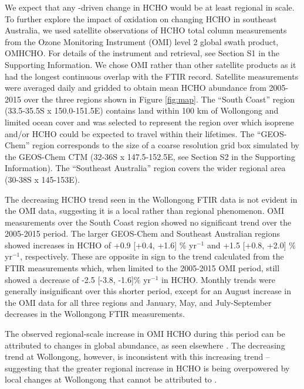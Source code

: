 \documentclass[draft,linenumbers]{AGUJournal}
\begin{document}
We expect that any -driven change in HCHO would be at least regional in scale. To further explore the impact of  oxidation on changing HCHO in southeast Australia, we used satellite observations of HCHO total column measurements from the Ozone Monitoring Instrument (OMI) level 2 global swath product, OMHCHO. For details of the instrument and retrieval, see Section S1 in the Supporting Information. We chose OMI rather than other satellite products as it had the longest continuous overlap with the FTIR record. Satellite measurements were averaged daily and gridded to obtain mean HCHO abundance from 2005-2015 over the three regions shown in Figure \ref{fig:map}. The ``South Coast'' region (33.5-35.5\degree S x 150.0-151.5\degree E) contains land within 100 km of Wollongong and limited ocean cover and was selected to represent the region over which isoprene and/or HCHO could be expected to travel within their lifetimes. The ``GEOS-Chem'' region corresponds to the size of a coarse resolution grid box simulated by the GEOS-Chem CTM (32-36\degree S x 147.5-152.5\degree E, see Section S2 in the Supporting Information). The ``Southeast Australia'' region covers the wider regional area (30-38\degree S x 145-153\degree E).

The decreasing HCHO trend seen in the Wollongong FTIR data is not evident in the OMI data, suggesting it is a local rather than regional phenomenon. OMI measurements over the South Coast region showed no significant trend over the 2005-2015 period. The larger GEOS-Chem and Southeast Australian regions showed increases in HCHO of +0.9 [+0.4, +1.6] \% yr$^{-1}$ and +1.5 [+0.8, +2.0] \% yr$^{-1}$, respectively. These are opposite in sign to the trend calculated from the FTIR measurements which, when limited to the 2005-2015 OMI period, still showed a decrease of -2.5 [-3.8, -1.6]\% yr$^{-1}$ in HCHO. Monthly trends were generally insignificant over this shorter period, except for an August increase in the OMI data for all three regions and January, May, and July-September decreases in the Wollongong FTIR measurements.

The observed regional-scale increase in OMI HCHO during this period can be attributed to changes in global  abundance, as seen elsewhere \citep{Franco2016}. The decreasing trend at Wollongong, however, is inconsistent with this increasing trend -- suggesting that the greater regional increase in HCHO is being overpowered by local changes at Wollongong that cannot be attributed to .
\end{document}
